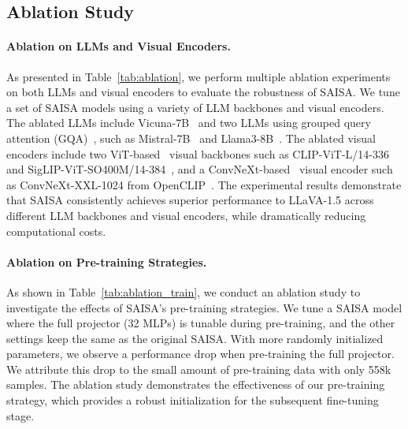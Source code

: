 \subsection{Ablation Study}
\paragraph{Ablation on LLMs and Visual Encoders.}
As presented in Table~\ref{tab:ablation}, we perform multiple ablation experiments on both LLMs and visual encoders to evaluate the robustness of SAISA.
We tune a set of SAISA models using a variety of LLM backbones and visual encoders.
The ablated LLMs include Vicuna-7B~\cite{vicuna} and two LLMs using grouped query attention (GQA)~\cite{ainslie2023gqatraininggeneralizedmultiquery}, such as Mistral-7B~\cite{jiang2023mistral7b} and Llama3-8B~\cite{llama3v}.
The ablated visual encoders include two ViT-based~\cite{dosovitskiy2021imageworth16x16words} visual backbones such as CLIP-ViT-L/14-336~\cite{radford2021learningtransferablevisualmodels} and  SigLIP-ViT-SO400M/14-384~\cite{zhai2023sigmoidlosslanguageimage}, and a ConvNeXt-based~\cite{liu2022convnet2020s} visual encoder such as ConvNeXt-XXL-1024 from OpenCLIP~\cite{ilharco_gabriel_2021_5143773, schuhmann2022laion5bopenlargescaledataset}.
The experimental results demonstrate that SAISA consistently achieves superior performance to LLaVA-1.5 across different LLM backbones and visual encoders, while dramatically reducing computational costs.

\vspace{-0.35cm}
\paragraph{Ablation on Pre-training Strategies.}
As shown in Table~\ref{tab:ablation_train}, we conduct an ablation study to investigate the effects of SAISA's pre-training strategies.
We tune a SAISA model where the full projector (32 MLPs) is tunable during pre-training, and the other settings keep the same as the original SAISA.
With more randomly initialized parameters, we observe a performance drop when pre-training the full projector.
We attribute this drop to the small amount of pre-training data with only 558k samples.
The ablation study demonstrates the effectiveness of our pre-training strategy, which provides a robust initialization for the subsequent fine-tuning stage.

\vspace{-0.35cm}
